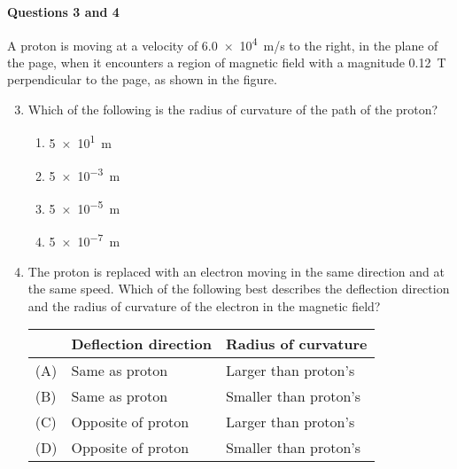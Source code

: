 \documentclass{../../oss-apphys}
\begin{document}
\begin{multicols}{2}
  \columnbreak

  \textbf{Questions 3 and 4}

  \begin{center}
  \end{center}
  A proton is moving at a velocity of \SI{6.0e4}{m/s} to the right, in the
  plane of the page, when it encounters a region of magnetic field with a
  magnitude \SI{0.12}{\tesla} perpendicular to the page, as shown in the
  figure.

  \begin{enumerate}[leftmargin=18pt]
    \setcounter{enumi}{2}
  \item Which of the following is the radius of curvature of the path of the
    proton?
    \begin{enumerate}[noitemsep,topsep=0pt,leftmargin=18pt,label=(\Alph*)]
    \item\SI{5e1}{\metre}
    \item\SI{5e-3}{\metre}
    \item\SI{5e-5}{\metre}
    \item\SI{5e-7}{\metre}
    \end{enumerate}

  \item The proton is replaced with an electron moving in the same direction
    and at the same speed. Which of the following best describes the
    deflection direction and the radius of curvature of the electron in the
    magnetic field?

    \begin{tabular}{lll}
      & \textbf{Deflection direction} & \textbf{Radius of curvature} \\
      \hline
      (A) & Same as proton & Larger than proton's \\
      (B) & Same as proton & Smaller than proton's \\
      (C) & Opposite of proton & Larger than proton's \\
      (D) & Opposite of proton & Smaller than proton's
    \end{tabular}


\end{enumerate}
\end{multicols}
\end{document}
